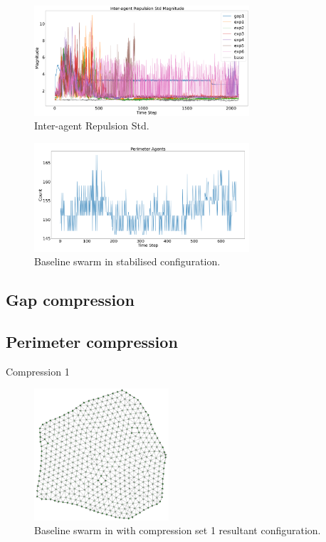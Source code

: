 \documentclass[12pt,a4paper]{IEEEtran}
\begin{document}
\begin{figure}[H]
	\begin{center}
		\includegraphics[width=8cm]{figures/InteragentRepulsionStd}
	\end{center}
	\caption{Inter-agent Repulsion Std. \label{fig:interagentRepulsionStd}}
\end{figure}


\begin{figure}[H]
	\begin{center}
		\includegraphics[width=8cm]{figures/baselineSwarmPerimeter}
	\end{center}
	\caption{Baseline swarm in stabilised configuration. \label{fig:baselineSwarmPerimeter}}
\end{figure}

\subsection{Gap compression}
\subsection{Perimeter compression}

Compression 1

\begin{figure}[H]
	\begin{center}
		\includegraphics[width=5cm]{figures/baselineSwarm1}
	\end{center}
	\caption{Baseline swarm in with compression set 1 resultant configuration. \label{fig:baselineSwarm1}}
\end{figure}
\end{document}
